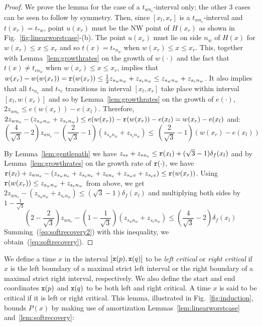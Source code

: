 \begin{proof}
We prove the lemma for the case of a $t_{wn_e}$-interval only; the other 3 cases
can be seen to follow by symmetry. Then, 
since $[x_l,x_r]$ is a $t_{wn_e}$-interval and $t(x_r)=t_{\ast w}$, point $u(x_r)$
must be the NW point of $H(x_r)$ as shown in
Fig.~\ref{fig:linearworstcase}-(b). The point $u(x_r)$ must lie on side $n_w$ of 
$H(x)$ for $w(x_r) \leq x \leq x_r$ and so  $t(x) = t_{\ast n_w}$ when
$w(x_r) \leq x \leq x_r$. This, together with Lemma~\ref{lem:growthrates} on the growth of $w(\cdot)$
and the fact that $t(x) \not= t_{en_w}$ when $w(x_r) \leq x \leq x_r$,
implies that $w(x_r) - w(w(x_r)) = {\tt r}(w(x_r)) \leq \frac{1}{2}z_{s_wn_w}+z_{s_en_w} \leq z_{s_wn_w}+z_{s_en_w}$.
It also implies that all $t_{\ast n_e}$ and $t_{\ast e}$ transitions
in interval $[x_l,x_r]$ take place within interval $[x_l,w(x_r)]$ and so by
Lemma~\ref{lem:growthrates} on the growth of $e(\cdot)$,  $2z_{wn_e} \leq e(w(x_r)) - e(x_l)$.
Therefore, $2z_{wn_e}-(z_{s_wn_w}+z_{s_en_w}) \leq e(w(x_r))-{\tt r}(w(x_r))-e(x_l) = w(x_r)-e(x_l)$ and:
\begin{equation}
\label{eq:softrecovery2}
\left(\frac{4}{\sqrt{3}} - 2\right)z_{wn_e}-\left(\frac{2}{\sqrt{3}} - 1\right)(z_{s_wn_w}+z_{s_en_w}) \leq\
\left(\frac{2}{\sqrt{3}}-1\right)(w(x_r)-e(x_l))
\end{equation}


By Lemma~\ref{lem:gentlepath} we have
$z_{\ast e}+z_{\ast n_e} \leq {\tt r}(x_l)+(\sqrt{3}-1)\delta_f(x_l)$ and by
Lemma~\ref{lem:growthrates} on the growth rate of ${\tt r}(\cdot)$, we have 
${\tt r}(x_l)+z_{wn_e}-(z_{s_wn_e}+z_{s_en_e}+z_{en_e}+z_{s_we}+z_{s_ee}) \leq {\tt r}(w(x_r))$.
Using ${\tt r}(w(x_r)) \leq z_{s_wn_w}+z_{s_en_w}$ from above, we get
$2z_{wn_e} - (z_{s_wn_w}+z_{s_en_w}) \leq (\sqrt{3}-1)\delta_f(x_l)$
and multiplying both sides by $1 - \frac{1}{\sqrt{3}}$
\[\left(2-\frac{2}{\sqrt{3}}\right)z_{wn_e} - \left(1-\frac{1}{\sqrt{3}}\right)(z_{s_wn_w}+z_{s_en_w}) \leq
	\left(\frac{4}{\sqrt{3}}-2\right)\delta_f(x_l)\]
Summing~(\ref{eq:softrecovery2}) with this inequality,
we obtain~(\ref{eq:softrecovery}).
\end{proof}

We define a time $x$ in the interval $[{\tt x}(p), {\tt x}(q)]$ to be
{\em left critical} 
or {\em right critical} if $x$ is the left boundary of a maximal strict 
left interval or the right boundary of a maximal strict 
right interval, respectively. We also define the start and end
coordinates ${\tt x}(p)$ and ${\tt x}(q)$ to be both left and right critical. A
time $x$ is said  to be critical if it is left or right critical.
This lemma, illustrated in Fig.~\ref{fig:induction}, 
 bounds $P(x)$ by making use of amortization
Lemmas~\ref{lem:linearworstcase} and~\ref{lem:softrecovery}:

